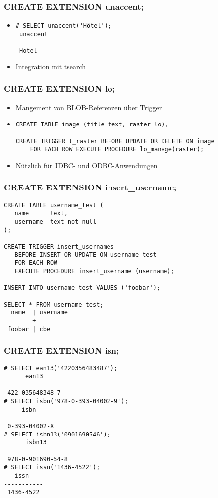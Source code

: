 \documentclass[utf8,hyperref={pdftex,colorlinks,linkcolor=black,citecolor=black,urlcolor=black,filecolor=black,plainpages=false},xcolor=table,hyperref]{beamer}
\begin{document}
\begin{frame}[containsverbatim]
	\frametitle{CREATE EXTENSION unaccent;}
	\begin{itemize}
		\item 
			\begin{verbatim}
# SELECT unaccent('Hôtel');
 unaccent 
----------
 Hotel
 \end{verbatim}
 \item Integration mit tsearch
	 \end{itemize} 
\end{frame}

\begin{frame}[containsverbatim]
	\frametitle{CREATE EXTENSION lo;}
	\begin{itemize}
		\item Mangement von BLOB-Referenzen über Trigger
		\item 
			\begin{verbatim}
CREATE TABLE image (title text, raster lo);

CREATE TRIGGER t_raster BEFORE UPDATE OR DELETE ON image
    FOR EACH ROW EXECUTE PROCEDURE lo_manage(raster);
    \end{verbatim}
		\item Nützlich für JDBC- und ODBC-Anwendungen
	\end{itemize}
\end{frame}

\begin{frame}[containsverbatim]
	\frametitle{CREATE EXTENSION insert_username;}
	\begin{verbatim}
CREATE TABLE username_test (
   name	     text,
   username  text not null
);

CREATE TRIGGER insert_usernames
   BEFORE INSERT OR UPDATE ON username_test
   FOR EACH ROW
   EXECUTE PROCEDURE insert_username (username);

INSERT INTO username_test VALUES ('foobar');

SELECT * FROM username_test;
  name  | username 
--------+----------
 foobar | cbe
\end{verbatim}

\end{frame}

\begin{frame}[containsverbatim]
	\frametitle{CREATE EXTENSION isn;}
	\begin{verbatim}
# SELECT ean13('4220356483487');
      ean13      
-----------------
 422-035648348-7
# SELECT isbn('978-0-393-04002-9');
     isbn      
---------------
 0-393-04002-X
# SELECT isbn13('0901690546');
      isbn13       
-------------------
 978-0-901690-54-8
# SELECT issn('1436-4522');
   issn    
-----------
 1436-4522
 \end{verbatim}
\end{frame}
\end{document}
